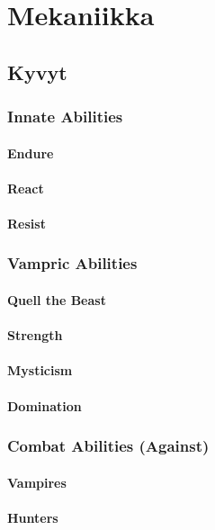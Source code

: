 \documentclass[a4paper, 12pt, finnish]{article}
\begin{document}
{\section{Mekaniikka}
	\subsection{Kyvyt}
		\subsubsection{Innate Abilities}
			\paragraph{Endure}
			\paragraph{React}
			\paragraph{Resist}
		\subsubsection{Vampric Abilities}
			\paragraph{Quell the Beast}
			\paragraph{Strength}
			\paragraph{Mysticism}
			\paragraph{Domination}
		\subsubsection{Combat Abilities (Against)}
			\paragraph{Vampires}
			\paragraph{Hunters}
}
\end{document}
